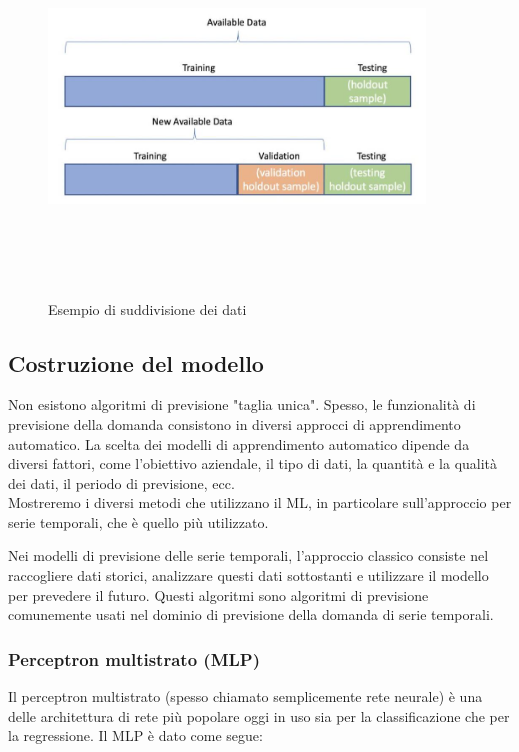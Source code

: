 \documentclass[12pt,a4paper]{report}
\begin{document}
\begin{figure}[h!]
    \begin{center}
        \includegraphics[width=10cm,height=10cm,keepaspectratio]{Data_forecast}
    \end{center}
    \caption{Esempio di suddivisione dei dati}
    \label{fig:data-split-forecast}
\end{figure}


\subsection{Costruzione del modello}
Non esistono algoritmi di previsione "taglia unica". Spesso, le funzionalità di previsione della domanda consistono in diversi approcci di apprendimento automatico. La scelta dei modelli di apprendimento automatico dipende da diversi fattori, come l'obiettivo aziendale, il tipo di dati, la quantità e la qualità dei dati, il periodo di previsione, ecc.\\
Mostreremo i diversi metodi che utilizzano il ML, in particolare sull'approccio per serie temporali, che è quello più utilizzato.

Nei modelli di previsione delle serie temporali, l'approccio classico consiste nel raccogliere dati storici, analizzare questi dati sottostanti e utilizzare il modello per prevedere il futuro. Questi algoritmi sono algoritmi di previsione comunemente usati nel dominio di previsione della domanda di serie temporali.

\subsubsection{Perceptron multistrato (MLP)}
Il perceptron multistrato (spesso chiamato semplicemente rete neurale) è una delle architettura di rete più popolare oggi in uso sia per la classificazione che per la regressione. Il MLP è dato come segue:
\end{document}
